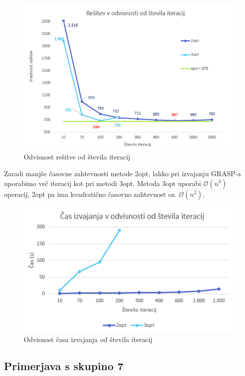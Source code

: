 \documentclass[12pt,a4paper]{amsart}
\theoremstyle{definition} %
\theoremstyle{plain} %
\begin{document}
\begin{figure}[h]
\caption{Odvisnost rešitve od števila iteracij}
\centering
\includegraphics[scale =0.8]{resitev_iteracije}
\end{figure}

Zaradi manjše časovne zahtevnosti metode 2opt, lahko pri izvajanju GRASP-a uporabimo več iteracij kot pri metodi 3opt. Metoda 3opt uporabi $\mathcal{O}(n^3)$ operacij, 2opt pa ima kvadratično časovno zahtevnost oz. $\mathcal{O}(n^2)$.

\begin{figure}[h]
\caption{Odvisnost časa izvajanja od števila iteracij}
\centering
\includegraphics[scale =0.8]{cas_izvajanja}
\end{figure}

\subsection{Primerjava s skupino 7} ~\\
\end{document}
